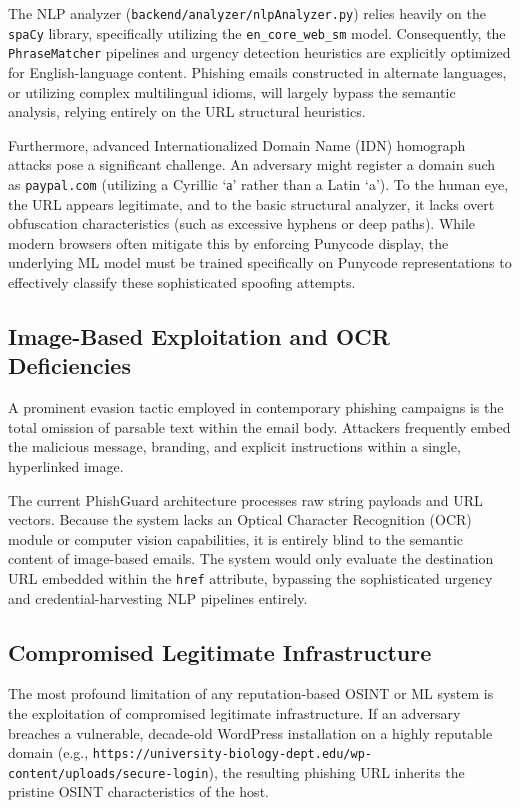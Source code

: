 The NLP analyzer (\texttt{backend/analyzer/nlpAnalyzer.py}) relies
heavily on the \texttt{spaCy} library, specifically utilizing the
\texttt{en\_core\_web\_sm} model. Consequently, the
\texttt{PhraseMatcher} pipelines and urgency detection heuristics are
explicitly optimized for English-language content. Phishing emails
constructed in alternate languages, or utilizing complex multilingual
idioms, will largely bypass the semantic analysis, relying entirely on
the URL structural heuristics.

Furthermore, advanced Internationalized Domain Name (IDN) homograph
attacks pose a significant challenge. An adversary might register a
domain such as \texttt{pаypal.com} (utilizing a Cyrillic `а' rather than
a Latin `a'). To the human eye, the URL appears legitimate, and to the
basic structural analyzer, it lacks overt obfuscation characteristics
(such as excessive hyphens or deep paths). While modern browsers often
mitigate this by enforcing Punycode display, the underlying ML model
must be trained specifically on Punycode representations to effectively
classify these sophisticated spoofing attempts.

\subsection{Image-Based Exploitation and OCR
Deficiencies}\label{image-based-exploitation-and-ocr-deficiencies}

A prominent evasion tactic employed in contemporary phishing campaigns
is the total omission of parsable text within the email body. Attackers
frequently embed the malicious message, branding, and explicit
instructions within a single, hyperlinked image.

The current PhishGuard architecture processes raw string payloads and
URL vectors. Because the system lacks an Optical Character Recognition
(OCR) module or computer vision capabilities, it is entirely blind to
the semantic content of image-based emails. The system would only
evaluate the destination URL embedded within the \texttt{href}
attribute, bypassing the sophisticated urgency and credential-harvesting
NLP pipelines entirely.

\subsection{Compromised Legitimate
Infrastructure}\label{compromised-legitimate-infrastructure}

The most profound limitation of any reputation-based OSINT or ML system
is the exploitation of compromised legitimate infrastructure. If an
adversary breaches a vulnerable, decade-old WordPress installation on a
highly reputable domain (e.g.,
\texttt{https://university-biology-dept.edu/wp-content/uploads/secure-login}),
the resulting phishing URL inherits the pristine OSINT characteristics
of the host.

